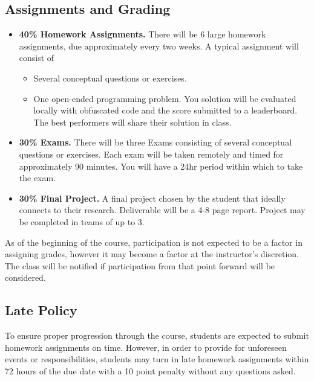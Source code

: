 \documentclass[9pt]{article}
\begin{document}
\begin{samepage}
\section*{Assignments and Grading}

\begin{itemize}[noitemsep]
    \item \textbf{40\% Homework Assignments.}
There will be 6 large homework assignments, due approximately every two weeks. A typical assignment will consist of
\begin{itemize}[nosep]
    \item Several conceptual questions or exercises.
    \item One open-ended programming problem. You solution will be evaluated locally with obfuscated code and the score submitted to a leaderboard. The best performers will share their solution in class.
\end{itemize}

\item \textbf{30\% Exams.}
There will be three Exams consisting of several conceptual questions or exercises. Each exam will be taken remotely and timed for approximately 90 minutes. You will have a 24hr period within which to take the exam.

\item \textbf{30\% Final Project.}
A final project chosen by the student that ideally connects to their research. Deliverable will be a 4-8 page report. Project may be completed in teams of up to 3.
\end{itemize}
As of the beginning of the course, participation is not expected to be a factor in assigning grades, however it may become a factor at the instructor's discretion. The class will be notified if participation from that point forward will be considered.
\end{samepage}

\subsection*{Late Policy}

To ensure proper progression through the course, students are expected to submit homework assignments on time. However, in order to provide for unforeseen events or responsibilities, students may turn in late homework assignments within 72 hours of the due date with a 10 point penalty without any questions asked.
\end{document}
